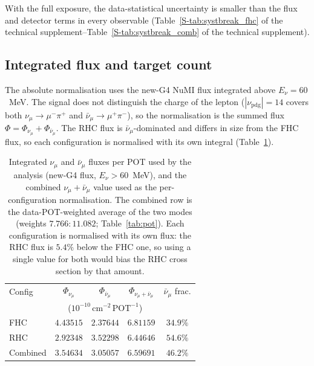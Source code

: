 \documentclass[11pt,a4paper]{article}
\newcommand{\suppref}[2]{#1~\ref{S-#2} of the technical supplement}
\begin{document}
With the full exposure, the data-statistical uncertainty is smaller than the flux and detector
terms in every observable (\suppref{Table}{tab:systbreak_fhc}--\suppref{Table}{tab:systbreak_comb}).

\subsection{Integrated flux and target count}
\label{sec:flux_status}

The absolute normalisation uses the new-G4 NuMI flux integrated above $E_\nu=60$~MeV. The signal
does not distinguish the charge of the lepton ($|\nu_\mathrm{pdg}|=14$ covers both
$\nu_\mu\to\mu^-\pi^+$ and $\bar{\nu}_\mu\to\mu^+\pi^-$), so the normalisation is the summed flux
$\Phi=\Phi_{\nu_\mu}+\Phi_{\bar{\nu}_\mu}$. The RHC flux is $\bar{\nu}_\mu$-dominated and differs
in size from the FHC flux, so each configuration is normalised with its own integral
(Table~\ref{tab:flux}).

\begin{table}[H]
  \centering
  \caption{Integrated $\nu_\mu$ and $\bar{\nu}_\mu$ fluxes per POT used by the analysis
    (new-G4 flux, $E_\nu > 60$~MeV), and the combined $\nu_\mu+\bar{\nu}_\mu$ value
    used as the per-configuration normalisation. The combined row is the
    data-POT-weighted average of the two modes (weights $7.766 : 11.082$;
    Table~\ref{tab:pot}). Each configuration is normalised with its own flux: the RHC
    flux is $5.4\%$ below the FHC one, so using a single value for both would bias the
    RHC cross section by that amount.}
  \label{tab:flux}
  \begin{tabular}{lcccc}
    \toprule
    Config & $\Phi_{\nu_\mu}$ & $\Phi_{\bar{\nu}_\mu}$ & $\Phi_{\nu_\mu+\bar{\nu}_\mu}$ & $\bar{\nu}_\mu$ frac. \\
           & \multicolumn{3}{c}{($10^{-10}\,\mathrm{cm}^{-2}\,\mathrm{POT}^{-1}$)} & \\
    \midrule
    FHC      & $4.43515$ & $2.37644$ & $6.81159$ & $34.9\%$ \\
    RHC      & $2.92348$ & $3.52298$ & $6.44646$ & $54.6\%$ \\
    Combined & $3.54634$ & $3.05057$ & $6.59691$ & $46.2\%$ \\
    \bottomrule
  \end{tabular}
\end{table}
\end{document}

